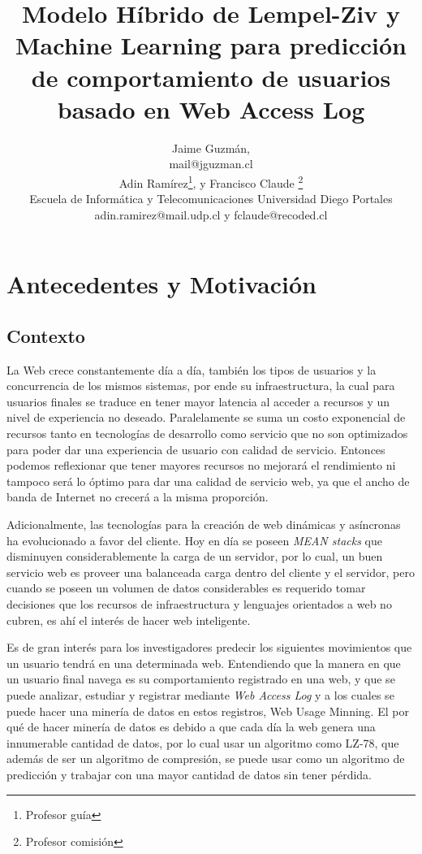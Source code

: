 \documentclass{udparticle}
\title{ Modelo Híbrido de Lempel-Ziv y Machine Learning para predicción de comportamiento de usuarios basado en Web Access Log }
\author{ Jaime Guzmán, \\ {\small mail@jguzman.cl}\protect\\[5pt]%
  {\small Adin Ramírez\thanks{Profesor guía}, y Francisco Claude \thanks{Profesor comisión}} \\
  {\small Escuela de Informática y Telecomunicaciones Universidad Diego Portales} \\
  {\small adin.ramirez@mail.udp.cl y fclaude@recoded.cl }\protect\\[5pt]%
}
\begin{document}
\maketitle
\section{Antecedentes y Motivación}

\subsection{Contexto}

  La Web crece constantemente día a día, también los tipos de usuarios y la concurrencia de los mismos sistemas, por ende su infraestructura, la cual para usuarios finales se traduce en tener mayor latencia al acceder a recursos y un nivel de experiencia no deseado. 
  Paralelamente se suma un costo exponencial de recursos tanto en tecnologías de desarrollo como servicio que no son optimizados para poder dar una experiencia de usuario con calidad de servicio. Entonces podemos reflexionar que tener mayores recursos no mejorará el rendimiento ni tampoco será lo óptimo para dar una calidad de servicio web, ya que el ancho de banda de Internet no crecerá a la misma proporción.
   
  Adicionalmente, las tecnologías para la creación de web dinámicas y asíncronas ha evolucionado a favor del cliente. Hoy en día se poseen \emph{MEAN stacks} que disminuyen considerablemente la carga de un servidor, por lo cual, un buen servicio web es proveer una balanceada carga dentro del cliente y el servidor, pero cuando se poseen un volumen de datos considerables es requerido tomar decisiones que los recursos de infraestructura y lenguajes orientados a web no cubren, es ahí el interés de hacer web inteligente.

  Es de gran interés para los investigadores predecir los siguientes movimientos que un usuario tendrá en una determinada web. Entendiendo que la manera en que un usuario final navega es su comportamiento registrado en una web, y que se puede analizar, estudiar y registrar mediante \emph{Web Access Log} y a los cuales se puede hacer una minería de datos en estos registros, Web Usage Minning. El por qué de hacer minería de datos es debido a que cada día la web genera una innumerable cantidad de datos, por lo cual usar un algoritmo como LZ-78, que además de ser un algoritmo de compresión, se puede usar como un algoritmo de predicción y trabajar con una mayor cantidad de datos sin tener pérdida.
  
\end{document}
